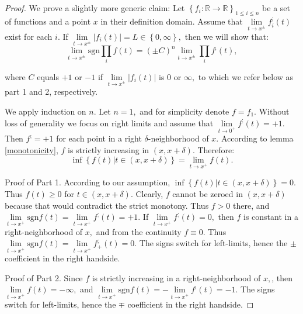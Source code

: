 \documentclass[11pt]{book}
\begin{document}
\begin{proof}
We prove a slightly more generic claim: Let $\left\{ f_{i}:\mathbb{R}\rightarrow\mathbb{R}\right\} _{1\leq i\leq n}$ be a set of functions and a point $x$ in their definition domain. Assume that $\underset{t\rightarrow x^{\pm}}{\lim}f_{i}^{;}\left(t\right)$ exist for each $i.$ If $\underset{t\rightarrow x^{\pm}}{\lim}\left|f_{i}\left(t\right)\right|=L\in\left\{ 0,\infty\right\},$ then we will show that:
$$\underset{t\rightarrow x^{\pm}}{\lim}\text{sgn}\underset{i}{\prod}f\left(t\right)=\left(\pm C\right)^{n}\underset{t\rightarrow x^{\pm}}{\lim}\underset{i}{\prod}f^{;}\left(t\right),$$

where $C$ equals $+1$ or $-1$ if $\underset{t\rightarrow x^{\pm}}{\lim}\left|f_{i}\left(t\right)\right|$ is $0$ or $\infty,$ to which we refer below as part 1 and 2, respectively.

We apply induction on $n.$ Let $n=1,$ and for simplicity denote $f=f_{1}.$ Without loss of generality we focus on right limits and assume that $\underset{t\rightarrow0^{+}}{\lim}f^{;}\left(t\right)=+1.$ Then $f^{;}=+1$ for each point in a right $\delta$-neighborhood of $x.$ According to lemma \ref{monotonicity}, $f$ is strictly increasing in $\left(x,x+\delta\right).$ Therefore:
$$\inf\left\{ f\left(t\right)|t\in\left(x,x+\delta\right)\right\} =\underset{t\rightarrow x^{+}}{\lim}f\left(t\right).$$

Proof of Part 1. According to our assumption, $\inf\left\{ f\left(t\right)|t\in\left(x,x+\delta\right)\right\} = 0.$ Thus $f\left(t\right)\geq0$ for $t\in\left(x,x+\delta\right).$ Clearly, $f$ cannot be zeroed in $\left(x,x+\delta\right)$ because that would contradict the strict monotony. Thus $f>0$ there, and $\underset{t\rightarrow x^{+}}{\lim}\text{sgn}f\left(t\right)=\underset{t\rightarrow x^{+}}{\lim}f^{;}\left(t\right)=+1.$ If $\underset{t\rightarrow x^{+}}{\lim}f^{;}\left(t\right)=0,$ then $f$ is constant in a right-neighborhood of $x,$ and from the continuity $f\equiv 0$. Thus $\underset{t\rightarrow x^{+}}{\lim}\text{sgn}f\left(t\right)=\underset{t\rightarrow x^{+}}{\lim}f_{+}^{;}\left(t\right)=0.$ The signs switch for left-limits, hence the $\pm$ coefficient in the right handside.

Proof of Part 2. Since $f$ is strictly increasing in a right-neighborhood of $x,$, then $\underset{t\rightarrow x^{+}}{\lim}f\left(t\right)=-\infty,$ and $\underset{t\rightarrow x^{+}}{\lim}\text{sgn}f\left(t\right)=-\underset{t\rightarrow x^{+}}{\lim}f^{;}\left(t\right)=-1.$ The signs switch for left-limits, hence the $\mp$ coefficient in the right handside.


\end{proof}
\end{document}
